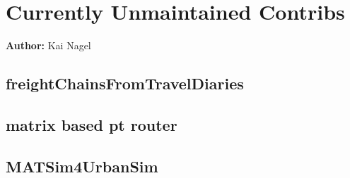 \chapter{Currently Unmaintained Contribs}
\label{ch:unmaintained}

\hfill \textbf{Author:} Kai Nagel

\section{freightChainsFromTravelDiaries}

\section{matrix based pt router}
\label{sec:matrix-based-pt-router}

\section{MATSim4UrbanSim}


